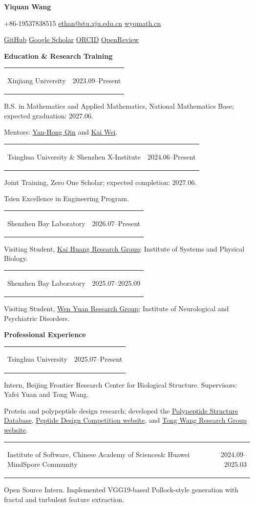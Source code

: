 \documentclass[11pt,a4paper]{article}
\makeatletter
\newcommand{\cvsection}[1]{%
  \par\addvspace{9pt}\Needspace{46pt}%
  {\centering\bfseries\fontsize{12}{14.5}\selectfont #1\par}%
  \nobreak\vspace{5pt}}
\newcommand{\entry}[3]{%
  \Needspace{42pt}%
  \begin{tabularx}{\linewidth}{@{}>{\bfseries\raggedright\arraybackslash}X@{\hspace{14pt}}r@{}}#1 & #2\end{tabularx}\par
  #3\par\vspace{5pt}}
\makeatother
\begin{document}
\fontsize{10.5}{13.3}\selectfont
\begin{center}
  {\fontsize{20}{23}\selectfont\textbf{Yiquan Wang}}\par\vspace{4pt}
  +86-19537838515 \enspace\textbullet\enspace
  \href{mailto:ethan@stu.xju.edu.cn}{ethan@stu.xju.edu.cn} \enspace\textbullet\enspace
  \href{https://wyqmath.cn/}{wyqmath.cn}\par
  \href{https://github.com/wyqmath}{GitHub} \enspace\textbullet\enspace
  \href{https://scholar.google.com/citations?user=ULP3e1cAAAAJ}{Google Scholar} \enspace\textbullet\enspace
  \href{https://orcid.org/0000-0003-1417-5752}{ORCID} \enspace\textbullet\enspace
  \href{https://openreview.net/profile?id=~Yiquan_Wang3}{OpenReview}
\end{center}
\vspace{-5pt}

\cvsection{Education \& Research Training}
\entry{Xinjiang University}{2023.09--Present}{
B.S. in Mathematics and Applied Mathematics, National Mathematics Base; expected graduation: 2027.06.\par
Mentors: \href{https://phy.xju.edu.cn/info/1032/1356.htm}{Yan-Hong Qin} and
\href{https://sky.xju.edu.cn/info/1042/1085.htm}{Kai Wei}.}
\entry{Tsinghua University \& Shenzhen X-Institute}{2024.06--Present}{
Joint Training, Zero One Scholar; expected completion: 2027.06.\par
Tsien Excellence in Engineering Program.}
\entry{Shenzhen Bay Laboratory}{2026.07--Present}{
Visiting Student, \href{https://www.szbl.ac.cn/research/groups/Kai-Huang.htm}{Kai Huang Research Group};
Institute of Systems and Physical Biology.}
\entry{Shenzhen Bay Laboratory}{2025.07--2025.09}{
Visiting Student, \href{https://www.szbl.ac.cn/research/group/Wen-Yuan.htm}{Wen Yuan Research Group};
Institute of Neurological and Psychiatric Disorders.}

\cvsection{Professional Experience}
\entry{Tsinghua University}{2025.07--Present}{
Intern, Beijing Frontier Research Center for Biological Structure. Supervisors: Yafei Yuan and Tong Wang.\par
Protein and polypeptide design research; developed the
\href{https://www.frcbs.tsinghua.edu.cn/cpdb/}{Polypeptide Structure Database},
\href{https://www.fbs.frcbs.tsinghua.edu.cn/competition/2025Peptide/}{Peptide Design Competition website},
and \href{https://wanggroup.ai/}{Tong Wang Research Group website}.}
\entry{Institute of Software, Chinese Academy of Sciences\newline \& Huawei MindSpore Community}{2024.09--2025.03}{
Open Source Intern. Implemented VGG19-based Pollock-style generation with fractal and turbulent feature extraction.}
\end{document}
